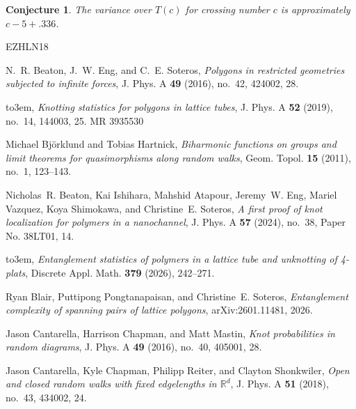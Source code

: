 \documentclass[11pt]{amsart}
\newtheorem{conjecture}[theorem]{Conjecture}
\theoremstyle{definition}
\theoremstyle{remark}
\numberwithin{equation}{section}
\begin{document}
\begin{conjecture}
The variance over $T(c)$ for crossing number $c$ is approximately $c-5+.336$.
\end{conjecture}





%


\newcommand{\etalchar}[1]{$^{#1}$}
\def\cprime{$'$}
\providecommand{\bysame}{\leavevmode\hbox to3em{\hrulefill}\thinspace}
\providecommand{\MR}{\relax\ifhmode\unskip\space\fi MR }
\providecommand{\MRhref}[2]{%
  \href{http://www.ams.org/mathscinet-getitem?mr=#1}{#2}
}
\providecommand{\href}[2]{#2}
\begin{thebibliography}{EZHLN18}

N.~R. Beaton, J.~W. Eng, and C.~E. Soteros, \emph{Polygons in restricted
  geometries subjected to infinite forces}, J. Phys. A \textbf{49} (2016),
  no.~42, 424002, 28.

\bysame, \emph{Knotting statistics for polygons in lattice tubes}, J. Phys. A
  \textbf{52} (2019), no.~14, 144003, 25. \MR{3935530}

Michael Bj\"{o}rklund and Tobias Hartnick, \emph{Biharmonic functions on groups
  and limit theorems for quasimorphisms along random walks}, Geom. Topol.
  \textbf{15} (2011), no.~1, 123--143.

\bibitem[BIA{\etalchar{+}}24]{BES+:nano}
Nicholas~R. Beaton, Kai Ishihara, Mahshid Atapour, Jeremy~W. Eng, Mariel
  Vazquez, Koya Shimokawa, and Christine~E. Soteros, \emph{A first proof of
  knot localization for polymers in a nanochannel}, J. Phys. A \textbf{57}
  (2024), no.~38, Paper No. 38LT01, 14.

\bibitem[BIA{\etalchar{+}}26]{BES+:4}
\bysame, \emph{Entanglement statistics of polymers in a lattice tube and
  unknotting of 4-plats}, Discrete Appl. Math. \textbf{379} (2026), 242--271.

Ryan Blair, Puttipong Pongtanapaisan, and Christine~E. Soteros,
  \emph{Entanglement complexity of spanning pairs of lattice polygons},
  arXiv:2601.11481, 2026.

Jason Cantarella, Harrison Chapman, and Matt Mastin, \emph{Knot probabilities
  in random diagrams}, J. Phys. A \textbf{49} (2016), no.~40, 405001, 28.

Jason Cantarella, Kyle Chapman, Philipp Reiter, and Clayton Shonkwiler,
  \emph{Open and closed random walks with fixed edgelengths in
  {$\mathbb{R}^d$}}, J. Phys. A \textbf{51} (2018), no.~43, 434002, 24.


\end{thebibliography}
\end{document}
